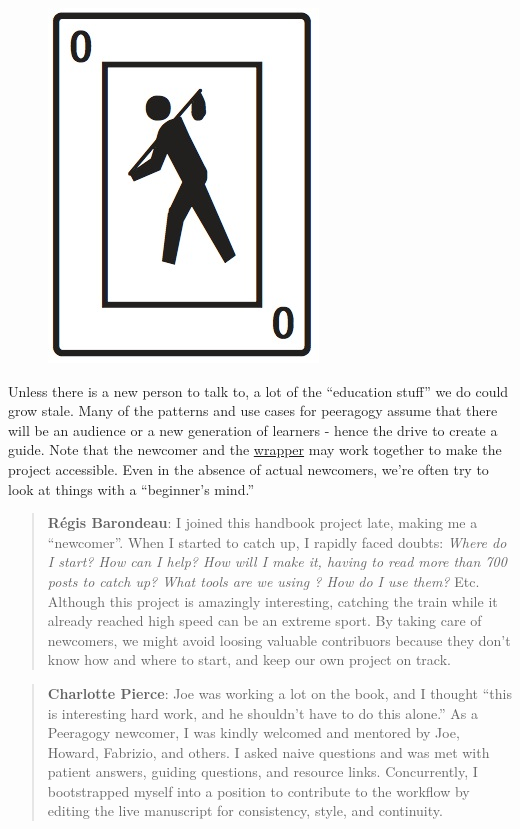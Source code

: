 \begin{figure}
\vspace{-13pt}
\includegraphics[width=.35\textwidth]{../pictures/unicode-fool.jpeg}
\vspace{-28pt}
\end{figure}

\noindent Unless there is a new person to talk to, a lot of the ``education
stuff'' we do could grow stale. Many of the patterns and use cases for
peeragogy assume that there will be an audience or a new generation of
learners - hence the drive to create a guide. Note that the newcomer and
the \href{http://peeragogy.org/practice/wrapper/}{wrapper} may work
together to make the project accessible. Even in the absence of actual
newcomers, we're often try to look at things with a
``beginner's mind.'' 

\begin{quote}
\textbf{Régis Barondeau}: I joined this handbook project late, making me
a ``newcomer''. When I started to catch up, I rapidly faced doubts:
\emph{Where do I start? How can I help? How will I make it, having to
read more than 700 posts to catch up? What tools are we using ? How do I
use them?} Etc. Although this project is amazingly interesting, catching
the train while it already reached high speed can be an extreme sport.
By taking care of newcomers, we might avoid loosing valuable contribuors
because they don't know how and where to start, and keep our own project
on track.
\end{quote}

\begin{quote}
\textbf{Charlotte Pierce}: Joe was working a lot on the book,
and I thought ``this is interesting hard work, and he shouldn't have to
do this alone.'' As a Peeragogy newcomer, I was kindly welcomed and
mentored by Joe, Howard, Fabrizio, and others. I asked naive questions
and was met with patient answers, guiding questions, and resource links.
Concurrently, I bootstrapped myself into a position to contribute to the
workflow by editing the live manuscript for consistency, style, and
continuity.
\end{quote}
